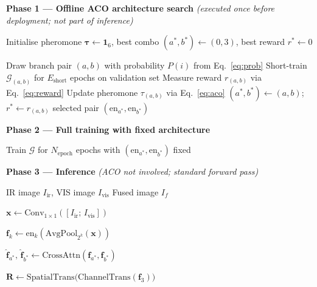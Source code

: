 \documentclass[a4paper,fleqn]{cas-dc}
\begin{document}
\begin{algorithm}[htbp]
\caption{ACO-TGFuse: Offline Search and Fixed-Architecture Inference}
\label{alg:acotgfuse}
\begin{algorithmic}[1]

\Statex \textbf{Phase 1 --- Offline ACO architecture search}
\Statex \hspace*{1em}\textit{(executed once before deployment; not part of inference)}

\State Initialise pheromone $\boldsymbol{\tau} \leftarrow \mathbf{1}_6$,\;
       best combo $(a^*,b^*) \leftarrow (0,3)$,\; best reward $r^* \leftarrow 0$

    \State Draw branch pair $(a,b)$ with probability $P(i)$ from Eq.~\eqref{eq:prob}
    \State Short-train $\mathcal{G}_{(a,b)}$ for $E_\mathrm{short}$ epochs on validation set
    \State Measure reward $r_{(a,b)}$ via Eq.~\eqref{eq:reward}
    \State Update pheromone $\tau_{(a,b)}$ via Eq.~\eqref{eq:aco}
      \State $(a^*,b^*) \leftarrow (a,b)$;\; $r^* \leftarrow r_{(a,b)}$
    \EndIf
  \EndFor
\EndFor
\State \Return selected pair $(\mathrm{en}_{a^*}, \mathrm{en}_{b^*})$

\Statex
\Statex \textbf{Phase 2 --- Full training with fixed architecture}

\State Train $\mathcal{G}$ for $N_\mathrm{epoch}$ epochs with
       $(\mathrm{en}_{a^*}, \mathrm{en}_{b^*})$ fixed

\Statex
\Statex \textbf{Phase 3 --- Inference}
\Statex \hspace*{1em}\textit{(ACO not involved; standard forward pass)}

\Require IR image $I_\mathrm{ir}$, VIS image $I_\mathrm{vis}$
\Ensure Fused image $I_f$

\State $\mathbf{x} \leftarrow \mathrm{Conv}_{1\times1}([I_\mathrm{ir};\,I_\mathrm{vis}])$

  \State $\mathbf{f}_k \leftarrow \mathrm{en}_k\!\left(\mathrm{AvgPool}_{2^k}(\mathbf{x})\right)$
\EndFor

\State $\hat{\mathbf{f}}_{a^*},\,\hat{\mathbf{f}}_{b^*}
       \leftarrow \mathrm{CrossAttn}(\mathbf{f}_{a^*}, \mathbf{f}_{b^*})$

\State $\mathbf{R} \leftarrow
       \mathrm{SpatialTrans}\!\bigl(\mathrm{ChannelTrans}(\mathbf{f}_3)\bigr)$


\end{algorithmic}
\end{algorithm}
\end{document}

